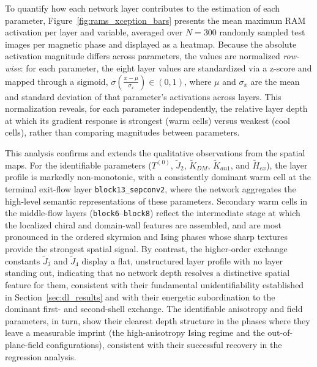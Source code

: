 \documentclass[final,5p,times,twocolumn]{elsarticle}
\begin{document}
To quantify how each network layer contributes to the
estimation of each parameter, Figure~\ref{fig:rams_xception_bars}
presents the mean maximum RAM activation per layer and
variable, averaged over $N=300$ randomly sampled test images
per magnetic phase and displayed as a heatmap. Because the
absolute activation magnitude differs across parameters, the
values are normalized \emph{row-wise}: for each parameter,
the eight layer values are standardized via a z-score and
mapped through a sigmoid, $\sigma\!\left(\frac{x - \mu}{\sigma_x}\right) \in (0,1)$,
where $\mu$ and $\sigma_x$ are the mean and standard deviation
of that parameter's activations across layers. This
normalization reveals, for each parameter independently, the
relative layer depth at which its gradient response is
strongest (warm cells) versus weakest (cool cells), rather
than comparing magnitudes between parameters.

This analysis confirms and extends the qualitative
observations from the spatial maps. For the identifiable
parameters ($T^{(0)}$, $\tilde{J}_2$, $\tilde{K}_{DM}$,
$\tilde{K}_{an1}$, and $\tilde{H}_{ex}$), the layer profile
is markedly non-monotonic, with a consistently dominant
warm cell at the terminal exit-flow layer
\texttt{block13\_sepconv2}, where the network aggregates the
high-level semantic representations of these parameters.
Secondary warm cells in the middle-flow layers
(\texttt{block6}--\texttt{block8}) reflect the intermediate
stage at which the localized chiral and domain-wall features
are assembled, and are most pronounced in the ordered
skyrmion and Ising phases whose sharp textures provide the
strongest spatial signal. By contrast, the higher-order
exchange constants $\tilde{J}_3$ and $\tilde{J}_4$ display a
flat, unstructured layer profile with no layer standing out,
indicating that no network depth resolves a distinctive
spatial feature for them, consistent with their
fundamental unidentifiability established in
Section~\ref{sec:dl_results} and with their energetic
subordination to the dominant first- and second-shell
exchange. The identifiable anisotropy and field parameters,
in turn, show their clearest depth structure in the phases
where they leave a measurable imprint (the high-anisotropy
Ising regime and the out-of-plane-field configurations),
consistent with their successful recovery in the regression
analysis.
\end{document}

